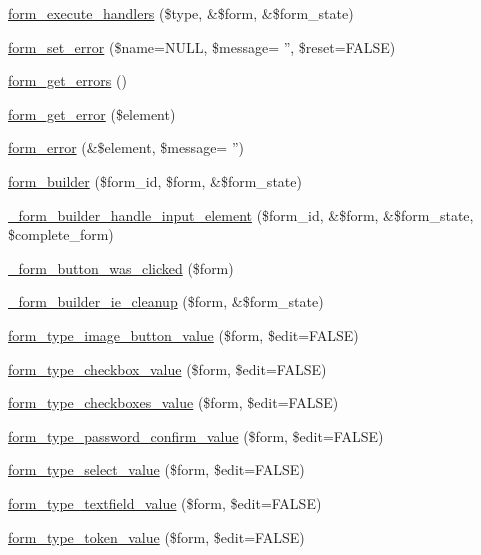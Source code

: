 \begin{CompactItemize}
\item 
\hyperlink{group__form__api_g9e32d49f4ca85da10a29dcfec27dd526}{form\_\-execute\_\-handlers} (\$type, \&\$form, \&\$form\_\-state)
\item 
\hyperlink{group__form__api_g08508e9a72925348973bb1a051a3ab99}{form\_\-set\_\-error} (\$name=NULL, \$message= '', \$reset=FALSE)
\item 
\hyperlink{group__form__api_g158b3db5e88e96bf060c524cebcb8130}{form\_\-get\_\-errors} ()
\item 
\hyperlink{group__form__api_ge57581ad2406d61116a133b99142283b}{form\_\-get\_\-error} (\$element)
\item 
\hyperlink{group__form__api_g0e6b470194005ad3ff2fbf45f671dfa9}{form\_\-error} (\&\$element, \$message= '')
\item 
\hyperlink{group__form__api_g52d4df482bbb0b49c23061cd715adf63}{form\_\-builder} (\$form\_\-id, \$form, \&\$form\_\-state)
\item 
\hyperlink{group__form__api_g609a63c66be83c0956899b3cfc665ff6}{\_\-form\_\-builder\_\-handle\_\-input\_\-element} (\$form\_\-id, \&\$form, \&\$form\_\-state, \$complete\_\-form)
\item 
\hyperlink{group__form__api_gd06129cdf0a951e8cce6d126d84acd32}{\_\-form\_\-button\_\-was\_\-clicked} (\$form)
\item 
\hyperlink{group__form__api_g7d997b259e62894fbfd69e9c4efcab99}{\_\-form\_\-builder\_\-ie\_\-cleanup} (\$form, \&\$form\_\-state)
\item 
\hyperlink{group__form__api_ga031aa7b832710f2a21d3b2351ed0fc6}{form\_\-type\_\-image\_\-button\_\-value} (\$form, \$edit=FALSE)
\item 
\hyperlink{group__form__api_gfe73ec471140a71b1d3f2810b4363592}{form\_\-type\_\-checkbox\_\-value} (\$form, \$edit=FALSE)
\item 
\hyperlink{group__form__api_g01c5405a174f6854caa1487451783ff1}{form\_\-type\_\-checkboxes\_\-value} (\$form, \$edit=FALSE)
\item 
\hyperlink{group__form__api_gf3479512bae1569cf68059608ecfe29d}{form\_\-type\_\-password\_\-confirm\_\-value} (\$form, \$edit=FALSE)
\item 
\hyperlink{group__form__api_g0b794da7fc875fa20913a98532a826d3}{form\_\-type\_\-select\_\-value} (\$form, \$edit=FALSE)
\item 
\hyperlink{group__form__api_g55b3eea2f5223cb98dbcdd83cc62e432}{form\_\-type\_\-textfield\_\-value} (\$form, \$edit=FALSE)
\item 
\hyperlink{group__form__api_g1bde00e0188d845783f528279775f80e}{form\_\-type\_\-token\_\-value} (\$form, \$edit=FALSE)

\end{CompactItemize}
